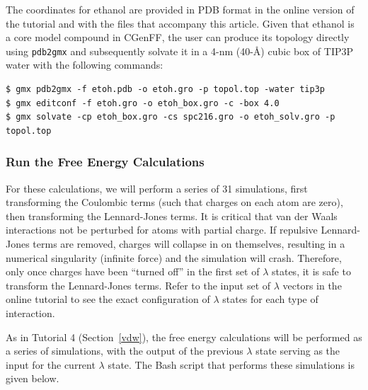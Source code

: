 \documentclass[9pt,tutorial,pubversion]{livecoms}
\begin{document}
The coordinates for ethanol are provided in PDB format in the online version of the tutorial and with the files that accompany this article. Given that ethanol is a core model compound in CGenFF, the user can produce its topology directly using \texttt{pdb2gmx} and subsequently solvate it in a 4-nm (40-\AA) cubic box of TIP3P water with the following commands:

\begin{lstlisting}
$ gmx pdb2gmx -f etoh.pdb -o etoh.gro -p topol.top -water tip3p
$ gmx editconf -f etoh.gro -o etoh_box.gro -c -box 4.0
$ gmx solvate -cp etoh_box.gro -cs spc216.gro -o etoh_solv.gro -p topol.top
\end{lstlisting}

\subsubsection{Run the Free Energy Calculations} \label{dgsolv_run}

For these calculations, we will perform a series of 31 simulations, first transforming the Coulombic terms (such that charges on each atom are zero), then transforming the Lennard-Jones terms. It is critical that van der Waals interactions not be perturbed for atoms with partial charge. If repulsive Lennard-Jones terms are removed, charges will collapse in on themselves, resulting in a numerical singularity (infinite force) and the simulation will crash. Therefore, only once charges have been ``turned off'' in the first set of $\lambda$ states, it is safe to transform the Lennard-Jones terms. Refer to the input set of $\lambda$ vectors in the online tutorial to see the exact configuration of $\lambda$ states for each type of interaction.

As in Tutorial 4 (Section~\ref{vdw}), the free energy calculations will be performed as a series of simulations, with the output of the previous $\lambda$ state serving as the input for the current $\lambda$ state. The Bash script that performs these simulations is given below.
\end{document}
